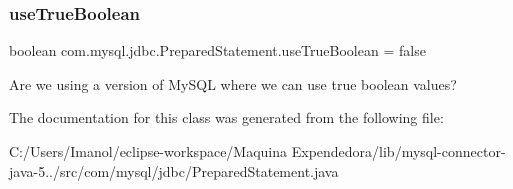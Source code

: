 \subsubsection{\texorpdfstring{use\+True\+Boolean}{useTrueBoolean}}
{\footnotesize\ttfamily boolean com.\+mysql.\+jdbc.\+Prepared\+Statement.\+use\+True\+Boolean = false\hspace{0.3cm}{\ttfamily [protected]}}

Are we using a version of My\+S\+QL where we can use \textquotesingle{}true\textquotesingle{} boolean values? 

The documentation for this class was generated from the following file\+:\begin{DoxyCompactItemize}
\item 
C\+:/\+Users/\+Imanol/eclipse-\/workspace/\+Maquina Expendedora/lib/mysql-\/connector-\/java-\/5../src/com/mysql/jdbc/Prepared\+Statement.\+java\end{DoxyCompactItemize}
